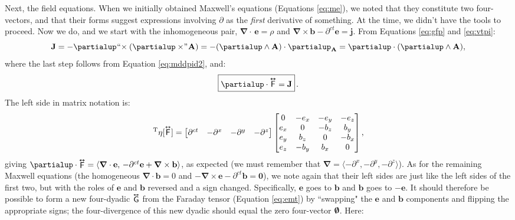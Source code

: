 \documentclass[12pt]{article}
\renewcommand{\vv}[1]{\mathbf{#1}}
\newcommand{\del}{\boldsymbol{\nabla}}
\newcommand{\tightoverset}[2]{%
  \mathop{#2}\limits^{\vbox to -.5ex{\kern-0.75ex\hbox{$#1$}\vss}}}
\newcommand{\inlinedy}[1]{\tightoverset{\text{\tiny$\bm\leftrightarrow$}}{#1}}
\newcommand{\capdy}[1]{ \overset{ \text{\tiny$\bm\leftrightarrow$} }{\vphantom{\text{\small{A}}}\smash{#1}} }
\begin{document}
Next, the field equations. When we initially obtained Maxwell's equations (Equations \ref{eq:me}), we noted that they constitute two four-vectors, and that their forms suggest expressions involving $\partialup$ as the \emph{first} derivative of something. At the time, we didn't have the tools to proceed. Now we do, and we start with the inhomogeneous pair, $\del \cdot \, \vv e = \rho$ and ${ \del \times \vv b - \partial^{ct} \vv e = \vv j }$. From Equations \ref{eq:gfp} and \ref{eq:vtpi}:
\begin{equation*}
\vv J = - \partialup \mkern1mu `` \mkern-4mu \times ( \partialup \times \mkern-4mu " \mkern1mu \vv A ) = - ( \partialup \wedge \vv A ) \cdot \partialup_{\vv A} = \partialup \cdot (\partialup \wedge \vv A),
\end{equation*}
where the last step follows from Equation \ref{eq:mddpid2}, and:
\begin{equation}\label{eq:ime}
\boxed{ \vphantom{A_{A_A}} \partialup \cdot \capdy{\mathsf{F}} = \vv J } \, .
\end{equation}
The left side in matrix notation is:
\begin{equation*}
[\partialup]^{\mathrm{T}} \eta [\capdy{\mathsf{F}}]
=
\begin{bmatrix}
\partial^{ct} & - \partial^x & - \partial^y & - \partial^z
\end{bmatrix}
\begin{bmatrix}
0 & -e_x & -e_y & -e_z \\
e_x & 0 & -b_z & b_y \\
e_y & b_z & 0 & -b_x \\
e_z & -b_y & b_x & 0
\end{bmatrix} ,
\end{equation*}
giving $\partialup \cdot \inlinedy{\mathsf{F}} = \langle \del \cdot \vv e , \, - \partial^{ct} \vv e + \del \times \vv b \rangle$, as expected (we must remember that ${\del = \langle - \partial^x , - \partial^y , - \partial^z \rangle}$). As for the remaining Maxwell equations (the homogeneous $\del \cdot \vv b = 0$ and ${ - \del \times \vv e - \partial^{ct} \vv b = \vv 0 }$), we note again that their left sides are just like the left sides of the first two, but with the roles of $\vv e$ and $\vv b$ reversed and a sign changed. Specifically, $\vv e$ goes to $\vv b$ and $\vv b$ goes to $- \vv e$. It should therefore be possible to form a new four-dyadic $\inlinedy{\mathsf{G}}$ from the Faraday tensor (Equation \ref{eq:emt}) by ``swapping" the $\vv e$ and $\vv b$ components and flipping the appropriate signs; the four-divergence of this new dyadic should equal the zero four-vector $\textrm{\mbox{\boldmath $\emptyset$}}$. Here:
\end{document}
